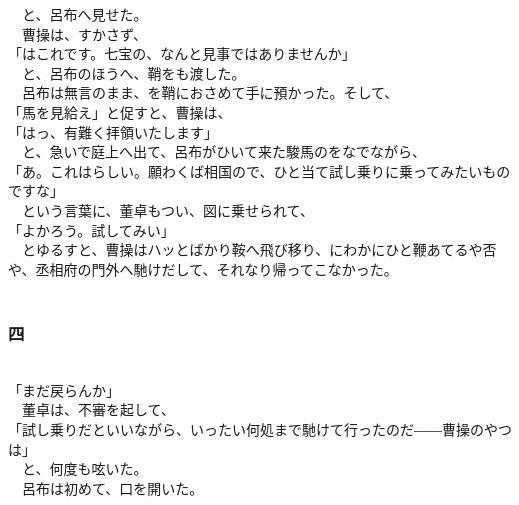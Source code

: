 \documentclass[
  paper=a5,
  fontsize=10pt,
  jafontsize=9.5pt,
  tate,                  %
  open_bracket_pos=nibu, %
]{jlreq}
\begin{document}
　と、呂布へ見せた。\\


　曹操は、すかさず、\\


「はこれです。七宝の、なんと見事ではありませんか」\\


　と、呂布のほうへ、鞘をも渡した。\\


　呂布は無言のまま、を鞘におさめて手に預かった。そして、\\


「馬を見給え」と促すと、曹操は、\\


「はっ、有難く拝領いたします」\\


　と、急いで庭上へ出て、呂布がひいて来た駿馬のをなでながら、\\


「あ。これはらしい。願わくば相国ので、ひと当て試し乗りに乗ってみたいものですな」\\


　という言葉に、董卓もつい、図に乗せられて、\\


「よかろう。試してみい」\\


　とゆるすと、曹操はハッとばかり鞍へ飛び移り、にわかにひと鞭あてるや否や、丞相府の門外へ馳けだして、それなり帰ってこなかった。\\

\\

\subsubsection{四}

\\


「まだ戻らんか」\\


　董卓は、不審を起して、\\


「試し乗りだといいながら、いったい何処まで馳けて行ったのだ――曹操のやつは」\\


　と、何度も呟いた。\\


　呂布は初めて、口を開いた。\\
\end{document}
